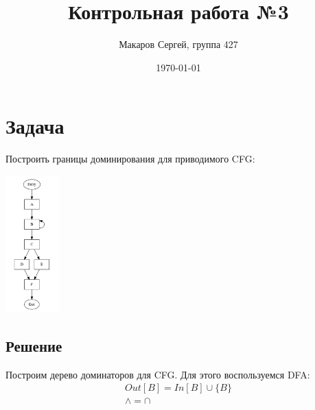 \documentclass[11pt]{article}
\author{Макаров Сергей, группа 427}
\date{\today}
\title{Контрольная работа №3}
\begin{document}
\maketitle

\section{Задача}
\label{sec:org442a6ab}
Построить границы доминирования для приводимого CFG:
\begin{center}
\includegraphics[height=200px]{cfg3.png}
\end{center}
\subsection{Решение}
\label{sec:orge53e9bf}
Построим дерево доминаторов для CFG. Для этого воспользуемся DFA:
\begin{gather*}
Out[B] = In[B] \cup \{B\} \\
\wedge = \cap
\end{gather*}
\end{document}
